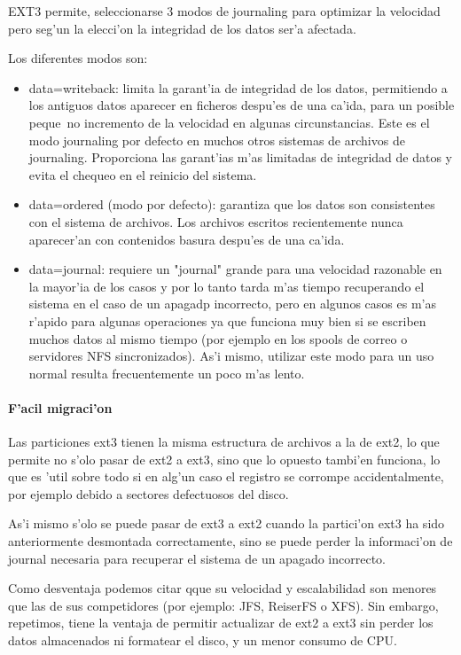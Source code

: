 EXT3 permite, seleccionarse 3 modos de journaling para optimizar la velocidad pero seg'un la elecci'on la integridad de los datos ser'a afectada.
						
Los diferentes modos son:
\begin{itemize}
	\item data=writeback: limita la garant'ia de integridad de los datos, permitiendo a los antiguos datos aparecer en ficheros despu'es de una ca'ida, para un posible peque~no incremento de la velocidad en algunas circunstancias. Este es el modo journaling por defecto en muchos otros sistemas de archivos de journaling. Proporciona las garant'ias m'as limitadas de integridad de datos y evita el chequeo en el reinicio del sistema.
	\item data=ordered (modo por defecto): garantiza que los datos son consistentes con el sistema de archivos. Los archivos escritos recientemente nunca aparecer'an con contenidos basura despu'es de una ca'ida.
	\item data=journal: requiere un "journal" grande para una velocidad razonable en la mayor'ia de los casos y por lo tanto tarda m'as tiempo recuperando el sistema en el caso de un apagadp incorrecto, pero en algunos casos es m'as r'apido para algunas operaciones ya que funciona muy bien si se escriben muchos datos al mismo tiempo (por ejemplo en los spools de correo o servidores NFS sincronizados). As'i mismo, utilizar este modo para un uso normal resulta frecuentemente un poco m'as lento.
\end{itemize}
					
\paragraph{F'acil migraci'on}
Las particiones ext3 tienen la misma estructura de archivos a la de ext2, lo que permite no s'olo pasar de ext2 a ext3, sino que lo opuesto tambi'en funciona, lo que es 'util sobre todo si en alg'un caso el registro se corrompe accidentalmente, por ejemplo debido a sectores defectuosos del disco.

As'i mismo s'olo se puede pasar de ext3 a ext2 cuando la partici'on ext3 ha sido anteriormente desmontada correctamente, sino se puede perder la informaci'on de journal necesaria para recuperar el sistema de un apagado incorrecto.
					
Como desventaja podemos citar qque su velocidad y escalabilidad son menores que las de sus competidores (por ejemplo: JFS, ReiserFS o XFS). Sin embargo, repetimos, tiene la ventaja de permitir actualizar de ext2 a ext3 sin perder los datos almacenados ni formatear el disco, y un menor consumo de CPU.
				
